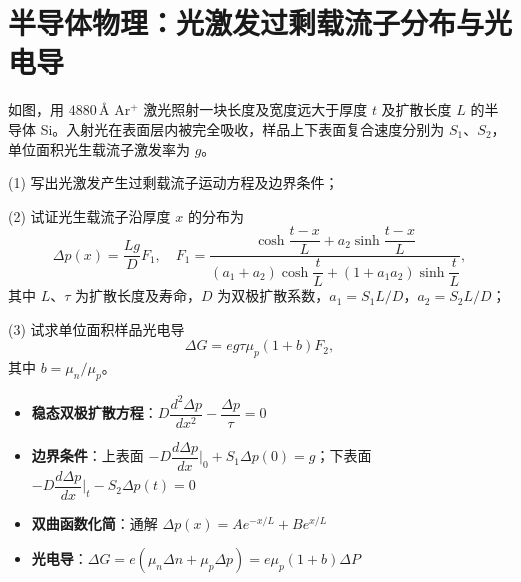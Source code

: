 \section{半导体物理：光激发过剩载流子分布与光电导}
\label{sec:photoconductivity}

\begin{modelbox}[题目：表面光激发半导体的载流子分布与光电导]
如图，用 $4880\,\text{\AA}$ Ar$^+$ 激光照射一块长度及宽度远大于厚度 $t$ 及扩散长度 $L$ 的半导体 Si。入射光在表面层内被完全吸收，样品上下表面复合速度分别为 $S_1$、$S_2$，单位面积光生载流子激发率为 $g$。

(1) 写出光激发产生过剩载流子运动方程及边界条件；

(2) 试证光生载流子沿厚度 $x$ 的分布为
\[
\Delta p(x)=\frac{Lg}{D}F_1,\quad F_1=\frac{\cosh\dfrac{t-x}{L}+a_2\sinh\dfrac{t-x}{L}}{(a_1+a_2)\cosh\dfrac{t}{L}+(1+a_1a_2)\sinh\dfrac{t}{L}},
\]
其中 $L$、$\tau$ 为扩散长度及寿命，$D$ 为双极扩散系数，$a_1=S_1L/D$，$a_2=S_2L/D$；

(3) 试求单位面积样品光电导
\[
\Delta G=eg\tau\mu_p(1+b)F_2,
\]
其中 $b=\mu_n/\mu_p$。
\end{modelbox}

\begin{tipbox}[考点快速分析]
\begin{itemize}
    \item \textbf{稳态双极扩散方程}：$D\dfrac{d^2\Delta p}{dx^2}-\dfrac{\Delta p}{\tau}=0$
    \item \textbf{边界条件}：上表面 $-D\dfrac{d\Delta p}{dx}\big|_0+S_1\Delta p(0)=g$；下表面 $-D\dfrac{d\Delta p}{dx}\big|_t-S_2\Delta p(t)=0$
    \item \textbf{双曲函数化简}：通解 $\Delta p(x)=Ae^{-x/L}+Be^{x/L}$
    \item \textbf{光电导}：$\Delta G=e(\mu_n\Delta n+\mu_p\Delta p)=e\mu_p(1+b)\Delta P$
\end{itemize}
\end{tipbox}


